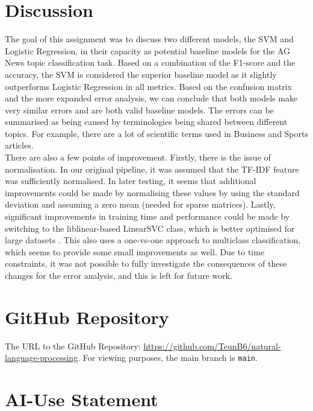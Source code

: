 \documentclass[12pt,a4paper,english]{article}
\begin{document}
\section{Discussion}
The goal of this assignment was to discuss two different models, the SVM and Logistic Regression, in their capacity as potential baseline models for the AG News topic classification task. Based on a combination of the F1-score and the accuracy, the SVM is considered the superior baseline model as it slightly outperforms Logistic Regression in all metrics. Based on the confusion matrix and the more expanded error analysis, we can conclude that both models make very similar errors and are both valid baseline models. The errors can be summarised as being caused by terminologies being shared between different topics. For example, there are a lot of scientific terms used in Business and Sports articles. 
\\
There are also a few points of improvement. Firstly, there is the issue of normalisation. In our original pipeline, it was assumed that the TF-IDF feature was sufficiently normalised. In later testing, it seems that additional improvements could be made by normalising these values by using the standard deviation and assuming a zero mean (needed for sparse matrices). Lastly, significant improvements in training time and performance could be made by switching to the liblinear-based LinearSVC class, which is better optimised for large datasets \cite{scikit-learn}. This also uses a one-vs-one approach to multiclass classification, which seems to provide some small improvements as well. Due to time constraints, it was not possible to fully investigate the consequences of these changes for the error analysis, and this is left for future work.


\newpage
\printbibliography

\suppressfloats[t]
\newpage
\appendix

\section{GitHub Repository}

The URL to the GitHub Repository: \href{https://github.com/TeunB6/natural-language-processing}{https://github.com/TeunB6/natural-language-processing}. For viewing purposes, the main branch is \texttt{main}.

\section{AI-Use Statement}
\end{document}
